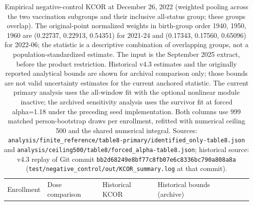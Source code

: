 \documentclass[
]{article}
\begin{document}
\begin{longtable}[]{@{}
  >{\raggedright\arraybackslash}p{}
  >{\raggedright\arraybackslash}p{}
  >{\raggedleft\arraybackslash}p{}
  >{\raggedright\arraybackslash}p{}
  >{\raggedright\arraybackslash}p{}
  >{\raggedright\arraybackslash}p{}@{}}
\caption{Empirical negative-control KCOR at December 26, 2022 (weighted pooling across the two vaccination subgroups and their inclusive all-status group; these groups overlap). The original-point normalized weights in birth-group order 1940, 1950, 1960 are (0.22737, 0.22913, 0.54351) for 2021-24 and (0.17343, 0.17560, 0.65096) for 2022-06; the statistic is a descriptive combination of overlapping groups, not a population-standardized estimate. The input is the September 2025 extract, before the product restriction. Historical v4.3 estimates and the originally reported analytical bounds are shown for archival comparison only; those bounds are not valid uncertainty estimates for the current anchored statistic. The current primary analysis uses the all-window fit with the optional nonlinear module inactive; the archived sensitivity analysis uses the survivor fit at forced alpha=1.18 under the preceding seed implementation. Both columns use 999 matched person-bootstrap draws per enrollment, refitted with numerical ceiling 500 and the shared numerical integral. Sources: \protect\texttt{analysis/finite\_reference/table8-primary/identified\_only-table8.json} and \protect\texttt{analysis/ceiling500/table8/forced\_alpha-table8.json}; historical source: v4.3 replay of Git commit \protect\texttt{bb2d68249e8bf77c8fb07e6c8336bc790a808a8a} (\protect\texttt{test/negative\_control/out/KCOR\_summary.log} at that commit).}\label{tbl:neg_control_summary}\tabularnewline
\toprule\noalign{}
\begin{minipage}[b]{\linewidth}\raggedright
Enrollment
\end{minipage} & \begin{minipage}[b]{\linewidth}\raggedright
Dose comparison
\end{minipage} & \begin{minipage}[b]{\linewidth}\raggedleft
Historical KCOR
\end{minipage} & \begin{minipage}[b]{\linewidth}\raggedright
Historical bounds (archive)

\end{minipage}
\end{longtable}
\end{document}
